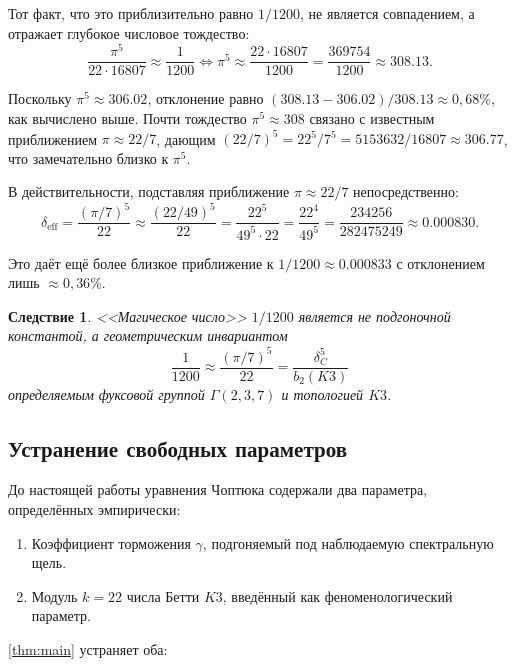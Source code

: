 \documentclass[12pt,a4paper]{article}
\newtheorem{corollary}[theorem]{Следствие}
\theoremstyle{definition}
\theoremstyle{remark}
\begin{document}
Тот факт, что это приблизительно равно $1/1200$, не является совпадением, а отражает глубокое числовое тождество:
\begin{equation}
\frac{\pi^5}{22 \cdot 16807} \approx \frac{1}{1200} \iff \pi^5 \approx \frac{22 \cdot 16807}{1200} = \frac{369754}{1200} \approx 308.13.
\end{equation}

Поскольку $\pi^5 \approx 306.02$, отклонение равно $(308.13 - 306.02)/308.13 \approx 0{,}68\%$, как вычислено выше. Почти тождество $\pi^5 \approx 308$ связано с известным приближением $\pi \approx 22/7$, дающим $(22/7)^5 = 22^5/7^5 = 5153632/16807 \approx 306.77$, что замечательно близко к $\pi^5$.

В действительности, подставляя приближение $\pi \approx 22/7$ непосредственно:
\begin{equation}
\delta_{\mathrm{eff}} = \frac{(\pi/7)^5}{22} \approx \frac{(22/49)^5}{22} = \frac{22^5}{49^5 \cdot 22} = \frac{22^4}{49^5} = \frac{234256}{282475249} \approx 0.000830.
\end{equation}

Это даёт ещё более близкое приближение к $1/1200 \approx 0.000833$ с отклонением лишь $\approx 0{,}36\%$.

\begin{corollary}
\label{cor:magic}
<<Магическое число>> $1/1200$ является не подгоночной константой, а геометрическим инвариантом
\begin{equation}
\frac{1}{1200} \approx \frac{(\pi/7)^5}{22} = \frac{\delta_C^5}{b_2(K3)}
\end{equation}
определяемым фуксовой группой $\Gamma(2,3,7)$ и топологией $K3$.
\end{corollary}

\subsection{Устранение свободных параметров}

До настоящей работы уравнения Чоптюка содержали два параметра, определённых эмпирически:
\begin{enumerate}
\item Коэффициент торможения $\gamma$, подгоняемый под наблюдаемую спектральную щель.
\item Модуль $k = 22$ числа Бетти $K3$, введённый как феноменологический параметр.
\end{enumerate}

\cref{thm:main} устраняет оба:
\end{document}
